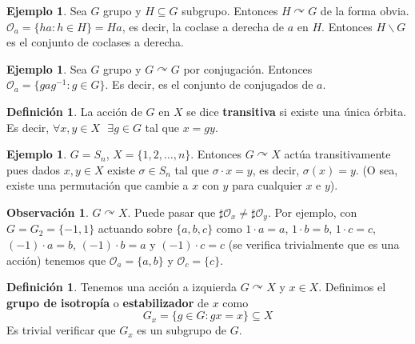 \documentclass[12pt]{book}
\theoremstyle{definition}
\newtheorem{obs}[teo]{Observación}
\newtheorem{defn}[teo]{Definición}
\newtheorem{ex}[teo]{Ejemplo}
\def\acts{\curvearrowright}
\begin{document}
\begin{ex}
Sea $G$ grupo y $H\subseteq G$ subgrupo. Entonces $H\acts G$ de la forma obvia. $\mathcal{O}_a = \{ha : h\in H\} = Ha$, es decir, la coclase a derecha de $a$ en $H$. Entonces $H\backslash G$ es el conjunto de coclases a derecha.
\end{ex}
\begin{ex}
Sea $G$ grupo y $G\acts G$ por conjugación. Entonces $\mathcal{O}_a = \{gag^{-1} : g\in G\}$. Es decir, es el conjunto de conjugados de $a$.
\end{ex}

\begin{defn}
La acción de $G$ en $X$ se dice \textbf{transitiva} si existe una única órbita. Es decir, $\forall x,y\in X \text{ } \exists g\in G$ tal que $x=gy$.
\end{defn}

\begin{ex}
$G=S_n$, $X=\{1,2,\ldots , n\}$. Entonces $G\acts X$ actúa transitivamente pues dados $x,y\in X$ existe $\sigma\in S_n$ tal que $\sigma\cdot x = y$, es decir, $\sigma(x)=y$. (O sea, existe una permutación que cambie a $x$ con $y$ para cualquier $x$ e $y$).
\end{ex}

\begin{obs}
$G\acts X$. Puede pasar que $\sharp\mathcal{O}_x \neq \sharp \mathcal{O}_y$. Por ejemplo, con $G=G_2=\{-1,1\}$ actuando sobre $\{a,b,c\}$ como $1\cdot a = a$, $1\cdot b = b$, $1\cdot c = c$, $(-1)\cdot a = b$, $(-1)\cdot b = a$ y $(-1)\cdot c = c$ (se verifica trivialmente que es una acción) tenemos que $\mathcal{O}_a = \{a,b\}$ y $\mathcal{O}_c = \{c\}$.
\end{obs}

\begin{defn}
Tenemos una acción a izquierda $G\acts X$ y $x\in X$. Definimos el \textbf{grupo de isotropía} o \textbf{estabilizador} de $x$ como $$G_x = \{g\in G : gx=x\}\subseteq X$$ Es trivial verificar que $G_x$ es un subgrupo de $G$.
\end{defn}
\end{document}
